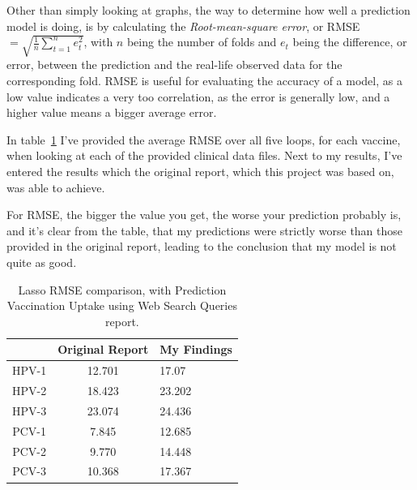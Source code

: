 \documentclass{sig-alternate}
\begin{document}
Other than simply looking at graphs, the way to determine how well a prediction model is doing, is by calculating the \textit{Root-mean-square error}, or RMSE $=\sqrt{\frac{1}{n}\sum_{t=1}^{n}e_t^2}$, with $n$ being the number of folds and $e_t$ being the difference, or error, between the prediction and the real-life observed data for the corresponding fold.  RMSE is useful for evaluating the accuracy of a model, as a low value indicates a very too correlation, as the error is generally low, and a higher value means a bigger average error.

 In table~\ref{table:RMSE} I've provided the average RMSE over all five loops, for each vaccine, when looking at each of the provided clinical data files. Next to my results, I've entered the results which the original report\cite{H2016}, which this project was based on, was able to achieve.

For RMSE, the bigger the value you get, the worse your prediction probably is, and it's clear from the table, that my predictions were strictly worse than those provided in the original report, leading to the conclusion that my model is not quite as good.

\begin{table}[h!]
\centering
\caption{Lasso RMSE comparison, with Prediction Vaccination Uptake using Web Search Queries report.}
\begin{tabular}{|c|c|l|} \hline
& Original Report & My Findings \\ \hline
HPV-1 & 12.701 & 17.07 \\
HPV-2 & 18.423 &  23.202 \\
HPV-3 & 23.074 & 24.436 \\\hline
PCV-1 & 7.845 & 12.685 \\
PCV-2 & 9.770 & 14.448 \\
PCV-3 & 10.368 & 17.367\\
\hline\end{tabular}
\label{table:RMSE}
\end{table}
\end{document}
